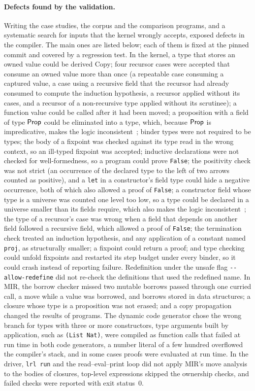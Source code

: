 \paragraph{Defects found by the validation.}
Writing the case studies, the corpus and the comparison programs, and a systematic search for inputs that the kernel wrongly accepts, exposed defects in the compiler. The main ones are listed below; each of them is fixed at the pinned commit and covered by a regression test.
In the kernel, a type that stores an owned value could be derived Copy; four recursor cases were accepted that consume an owned value more than once (a repeatable case consuming a captured value, a case using a recursive field that the recursor had already consumed to compute the induction hypothesis, a recursor applied without its cases, and a recursor of a non-recursive type applied without its scrutinee); a function value could be called after it had been moved; a proposition with a field of type $\mathsf{Prop}$ could be eliminated into a type, which, because $\mathsf{Prop}$ is impredicative, makes the logic inconsistent~\cite{hurkens1995}; binder types were not required to be types; the body of a fixpoint was checked against its type read in the wrong context, so an ill-typed fixpoint was accepted; inductive declarations were not checked for well-formedness, so a program could prove \lstinline|False|; the positivity check was not strict (an occurrence of the declared type to the left of two arrows counted as positive), and a \lstinline|let| in a constructor's field type could hide a negative occurrence, both of which also allowed a proof of \lstinline|False|; a constructor field whose type is a universe was counted one level too low, so a type could be declared in a universe smaller than its fields require, which also makes the logic inconsistent~\cite{hurkens1995}; the type of a recursor's case was wrong when a field that depends on another field followed a recursive field, which allowed a proof of \lstinline|False|; the termination check treated an induction hypothesis, and any application of a constant named \lstinline|proj|, as structurally smaller; a fixpoint could return a proof; and type checking could unfold fixpoints and restarted its step budget under every binder, so it could crash instead of reporting failure. Redefinition under the unsafe flag \texttt{-{}-allow-redefine} did not re-check the definitions that used the redefined name.
In MIR, the borrow checker missed two mutable borrows passed through one curried call, a move while a value was borrowed, and borrows stored in data structures; a closure whose type is a proposition was not erased; and a copy propagation changed the results of programs.
The dynamic code generator chose the wrong branch for types with three or more constructors, type arguments built by application, such as \lstinline|(List Nat)|, were compiled as function calls that failed at run time in both code generators, a number literal of a few hundred overflowed the compiler's stack, and in some cases proofs were evaluated at run time.
In the driver, \texttt{lrl run} and the read--eval--print loop did not apply MIR's move analysis to the bodies of closures, top-level expressions skipped the ownership checks, and failed checks were reported with exit status~0.

